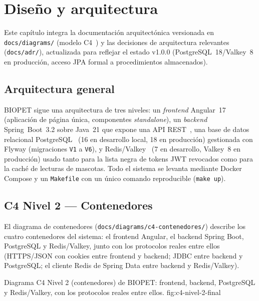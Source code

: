 \chapter{Dise\~no y arquitectura}
\label{cap:arquitectura}

Este cap\'itulo integra la documentaci\'on arquitect\'onica versionada en
\texttt{docs/diagrams/} (modelo C4~\cite{c4-model}) y las decisiones de
arquitectura relevantes (\texttt{docs/adr/}), actualizada para reflejar el
estado v1.0.0 (PostgreSQL~18/Valkey~8 en producci\'on, acceso JPA formal a
procedimientos almacenados).

\section{Arquitectura general}

BIOPET sigue una arquitectura de tres niveles: un \emph{frontend} Angular~17
(aplicaci\'on de p\'agina \'unica, componentes \emph{standalone}), un
\emph{backend} Spring~Boot~3.2 sobre Java~21 que expone una API
REST~\cite{spring-boot-docs}, una base de datos relacional
PostgreSQL~\cite{postgresql-docs} (16 en desarrollo local, 18 en
producci\'on) gestionada con Flyway (migraciones \texttt{V1} a
\texttt{V6}), y Redis/Valkey~\cite{redis-docs} (7 en desarrollo, Valkey~8
en producci\'on) usado tanto para la lista negra de tokens JWT revocados
como para la cach\'e de lecturas de mascotas. Todo el sistema se
levanta mediante Docker Compose y un \texttt{Makefile} con un \'unico
comando reproducible (\texttt{make up}).

\section{C4 Nivel 2 --- Contenedores}
\label{sec:c4-nivel-2}

El diagrama de contenedores (\texttt{docs/diagrams/c4-contenedores/})
describe los cuatro contenedores del sistema: el frontend Angular, el
backend Spring Boot, PostgreSQL y Redis/Valkey, junto con los protocolos
reales entre ellos (HTTPS/JSON con cookies entre frontend y backend; JDBC
entre backend y PostgreSQL; el cliente Redis de Spring Data entre backend
y Redis/Valkey).

%
{Diagrama C4 Nivel 2 (contenedores) de BIOPET: frontend, backend, PostgreSQL y Redis/Valkey, con los protocolos reales entre ellos.}%
{fig:c4-nivel-2-final}

